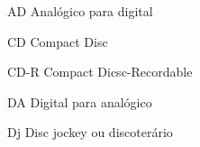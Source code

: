 \begin{siglas}

\item[AD] Analógico para digital
\item[CD] Compact Disc
\item[CD-R] Compact Dicsc-Recordable
\item[DA] Digital para analógico
\item[Dj] Disc jockey ou discoterário

\end{siglas}
